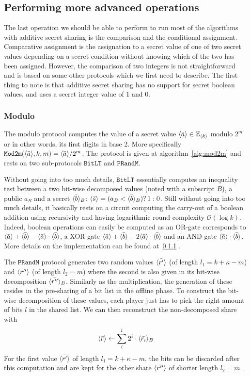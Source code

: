 \subsection{Performing more advanced operations}
The last operation we should be able to perform to run most of the algorithms with additive secret sharing is the comparison and the conditional assignment. Comparative assignment is the assignation to a secret value of one of two secret values depending on a secret condition without knowing which of the two has been assigned. However, the comparison of two integers is not straightforward and is based on some other protocols which we first need to describe. The first thing to note is that additive secret sharing has no support for secret boolean values, and uses a secret integer value of 1 and 0.

\subsubsection{Modulo}
The modulo protocol computes the value of a secret value $\langle \bar{a} \rangle \in \mathbb{Z}_{\langle k \rangle}$ modulo $2^m$ or in other words, its first digits in base 2. More specifically $\mathtt{Mod2m}(\langle \bar{a} \rangle,k,m) = \langle \bar{a} \rangle / 2^m$. The protocol is given at algorithm~\ref{alg:mod2m} and rests on two sub-protocols $\mathtt{BitLT}$ and $\mathtt{PRandM}$. 

Without going into too much details, $\mathtt{BitLT}$ essentially computes an inequality test between a two bit-wise decomposed values (noted with a subscript $B$), a public $a_B$ and a secret $\langle \bar{b} \rangle_B$: $\langle \bar{s} \rangle = (a_B < \langle \bar{b} \rangle_B)? \, 1:0$. Still without going into too much details, it basically rests on a circuit computing the carry-out of a boolean addition using recursivity and having logarithmic round complexity $\mathcal{O}(\log k)$. Indeed, boolean operations can easily be computed as an OR-gate corresponds to $\langle \bar{a} \rangle+\langle \bar{b} \rangle - \langle \bar{a} \rangle\cdot \langle \bar{b} \rangle$, a XOR-gate $\langle \bar{a} \rangle+\langle \bar{b} \rangle - 2\langle \bar{a} \rangle\cdot \langle \bar{b} \rangle$ and an AND-gate $\langle \bar{a} \rangle\cdot \langle \bar{b} \rangle$. More details on the implementation can be found at~\ref{} .

The $\mathtt{PRandM}$ protocol generates two random values $\langle \bar{r'} \rangle$ (of length $l_1 = k + \kappa -m$) and $\langle \bar{r''} \rangle$ (of length $l_2 = m$) where the second is also given in its bit-wise decomposition $\langle \bar{r''} \rangle_B$. Similarly as the multiplication, the generation of these resides in the pre-sharing of a bit list in the offline phase. To construct the bit-wise decomposition of these values, each player just has to pick the right amount of bits $l$ in the shared list. We can then reconstruct the non-decomposed share with
\begin{equation}
    \langle \bar{r} \rangle \leftarrow \sum_i^l 2^i \cdot \langle \bar{r_i} \rangle_B
\end{equation}
For the first value $\langle \bar{r'} \rangle$ of length $l_1 = k + \kappa -m$, the bits can be discarded after this computation and are kept for the other share $\langle \bar{r''} \rangle$ of shorter length $l_2 = m$.

